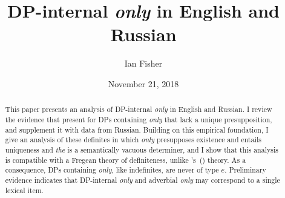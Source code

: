 \documentclass{article}
\title{DP-internal \textit{only} in English and Russian}
\author{Ian Fisher}
\date{November 21, 2018}
\newcommand{\citegen}[1]{\citeauthor{#1}'s~(\citeyear{#1})}
\begin{document}
\maketitle

\begin{abstract}
This paper presents an analysis of DP-internal \textit{only} in English and Russian. I review the evidence that \citet{cb2012b, cb2015} present for DPs containing \textit{only} that lack a unique presupposition, and supplement it with data from Russian. Building on this empirical foundation, I give an analysis of these definites in which \textit{only} presupposes existence and entails uniqueness and \textit{the} is a semantically vacuous determiner, and I show that this analysis is compatible with a Fregean theory of definiteness, unlike \citegen{cb2015} theory. As a consequence, DPs containing \textit{only}, like indefinites, are never of type $e$. Preliminary evidence indicates that DP-internal \textit{only} and adverbial \textit{only} may correspond to a single lexical item.
\end{abstract}












\end{document}
